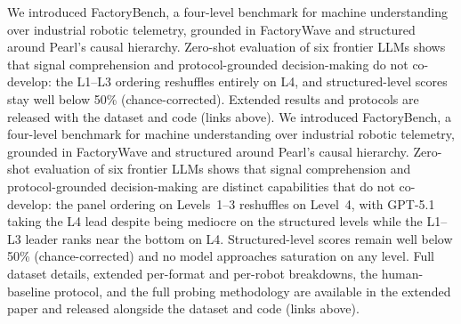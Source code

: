 \ifworkshopcompact
We introduced FactoryBench, a four-level benchmark for machine understanding over industrial robotic telemetry, grounded in FactoryWave and structured around Pearl's causal hierarchy. Zero-shot evaluation of six frontier LLMs shows that signal comprehension and protocol-grounded decision-making do not co-develop: the L1--L3 ordering reshuffles entirely on L4, and structured-level scores stay well below 50\% (chance-corrected). \workshopclosingnote{} Extended results and protocols are released with the dataset and code (links above).
\else
We introduced FactoryBench, a four-level benchmark for machine understanding over industrial robotic telemetry, grounded in FactoryWave and structured around Pearl's causal hierarchy. Zero-shot evaluation of six frontier LLMs shows that signal comprehension and protocol-grounded decision-making are distinct capabilities that do not co-develop: the panel ordering on Levels~1--3 reshuffles on Level~4, with GPT-5.1 taking the L4 lead despite being mediocre on the structured levels while the L1--L3 leader ranks near the bottom on L4. Structured-level scores remain well below 50\% (chance-corrected) and no model approaches saturation on any level. \workshopclosingnote{} Full dataset details, extended per-format and per-robot breakdowns, the human-baseline protocol, and the full probing methodology are available in the extended paper and released alongside the dataset and code (links above).
\fi

\clearpage


